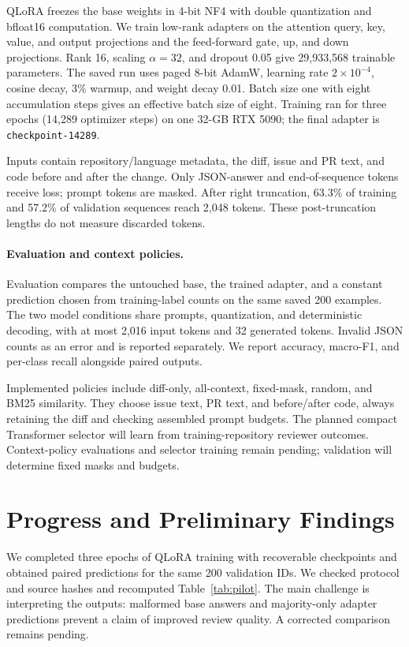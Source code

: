 \documentclass{article}
\begin{document}
QLoRA \citep{dettmers2023} freezes the base weights in 4-bit NF4 with double quantization and bfloat16 computation. We train low-rank adapters on the attention query, key, value, and output projections and the feed-forward gate, up, and down projections. Rank 16, scaling $\alpha=32$, and dropout 0.05 give 29,933,568 trainable parameters. The saved run uses paged 8-bit AdamW, learning rate $2\times10^{-4}$, cosine decay, 3\% warmup, and weight decay 0.01. Batch size one with eight accumulation steps gives an effective batch size of eight. Training ran for three epochs (14,289 optimizer steps) on one 32-GB RTX 5090; the final adapter is \texttt{checkpoint-14289}.

Inputs contain repository/language metadata, the diff, issue and PR text, and code before and after the change. Only JSON-answer and end-of-sequence tokens receive loss; prompt tokens are masked. After right truncation, 63.3\% of training and 57.2\% of validation sequences reach 2,048 tokens. These post-truncation lengths do not measure discarded tokens.

\paragraph{Evaluation and context policies.}
Evaluation compares the untouched base, the trained adapter, and a constant prediction chosen from training-label counts on the same saved 200 examples. The two model conditions share prompts, quantization, and deterministic decoding, with at most 2,016 input tokens and 32 generated tokens. Invalid JSON counts as an error and is reported separately. We report accuracy, macro-F1, and per-class recall alongside paired outputs.

Implemented policies include diff-only, all-context, fixed-mask, random, and BM25 similarity. They choose issue text, PR text, and before/after code, always retaining the diff and checking assembled prompt budgets. The planned compact Transformer selector will learn from training-repository reviewer outcomes. Context-policy evaluations and selector training remain pending; validation will determine fixed masks and budgets.

\section{Progress and Preliminary Findings}
We completed three epochs of QLoRA training with recoverable checkpoints and obtained paired predictions for the same 200 validation IDs. We checked protocol and source hashes and recomputed Table~\ref{tab:pilot}. The main challenge is interpreting the outputs: malformed base answers and majority-only adapter predictions prevent a claim of improved review quality. A corrected comparison remains pending.
\end{document}
